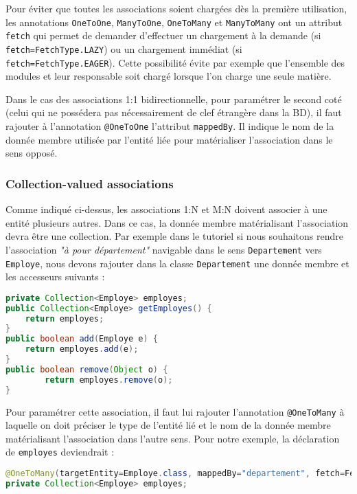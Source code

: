\documentclass[a4paper,11pt]{article}
\begin{document}
Pour éviter que toutes les associations soient chargées dès la première utilisation, les annotations \texttt{OneToOne}, 
\texttt{ManyToOne}, \texttt{OneToMany} et \texttt{ManyToMany} ont un attribut \texttt{fetch} qui permet de demander 
d'effectuer un chargement à la demande (si \texttt{fetch=FetchType.LAZY}) ou un chargement immédiat 
(si \texttt{fetch=FetchType.EAGER}). Cette possibilité évite par exemple que l'ensemble des modules et leur responsable 
soit chargé lorsque l'on charge une seule matière.

Dans le cas des associations 1:1 bidirectionnelle, pour paramétrer le second coté (celui qui ne possédera pas nécessairement 
de clef étrangère dans la BD), il faut rajouter à l'annotation \texttt{@OneToOne} l'attribut \texttt{mappedBy}. Il indique 
le nom de la donnée membre utilisée par l'entité liée pour matérialiser l'association dans le sens opposé.

\subsubsection{Collection-valued associations}
Comme indiqué ci-dessus, les associations 1:N et M:N doivent associer à une entité plusieurs autres. Dans ce cas, la 
donnée membre matérialisant l'association devra être une collection. Par exemple dans le tutoriel si nous souhaitons 
rendre l'association \textit{"à pour département"} navigable dans le sens \texttt{Departement} vers \texttt{Employe}, 
nous devons rajouter dans la classe \texttt{Departement} une donnée membre et les accesseurs suivants :

\begin{lstlisting}[language=Java,style=customjava]
private Collection<Employe> employes;
public Collection<Employe> getEmployes() {
	return employes;
}
public boolean add(Employe e) {
	return employes.add(e);
}
public boolean remove(Object o) {
		return employes.remove(o);
}
\end{lstlisting}

Pour paramétrer cette association, il faut lui rajouter l'annotation \texttt{@OneToMany} à laquelle on doit 
préciser le type de l'entité lié et le nom de la donnée membre matérialisant l'association dans l'autre sens. Pour notre
exemple, la déclaration de \texttt{employes} deviendrait :

\begin{lstlisting}[language=Java,style=customjava]
@OneToMany(targetEntity=Employe.class, mappedBy="departement", fetch=FetchType.EAGER)
private Collection<Employe> employes;
\end{lstlisting} 
\end{document}
